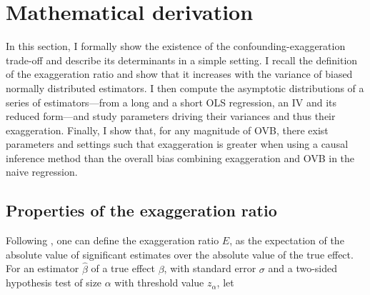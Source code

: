 \documentclass[usletter, 12pt]{article}
\begin{document}
	\section{Mathematical derivation} \label{maths}
						
		In this section, I formally show the existence of the confounding-exaggeration trade-off  and describe its determinants in a simple setting. %
		I recall the definition of the exaggeration ratio and show that it increases with the variance of biased normally distributed estimators. I then compute the asymptotic distributions of a series of estimators---from a long and a short OLS regression, an IV and its reduced form---and study parameters driving their variances and thus their exaggeration. Finally, I show that, for any magnitude of OVB, there exist parameters and settings such that exaggeration is greater when using a causal inference method than the overall bias combining exaggeration and OVB in the naive regression.
		
		
		\subsection{Properties of the exaggeration ratio}\label{general_exagg}
		
			Following \cite{gelman_beyond_2014}, one can define the exaggeration ratio $E$, as the expectation of the absolute value of significant estimates over the absolute value of the true effect. For an estimator $\hat{\beta}$ of a true effect $\beta$, with standard error $\sigma$ and a two-sided hypothesis test of size $\alpha$ with threshold value $z_{\alpha}$, let
			
		 
\end{document}
